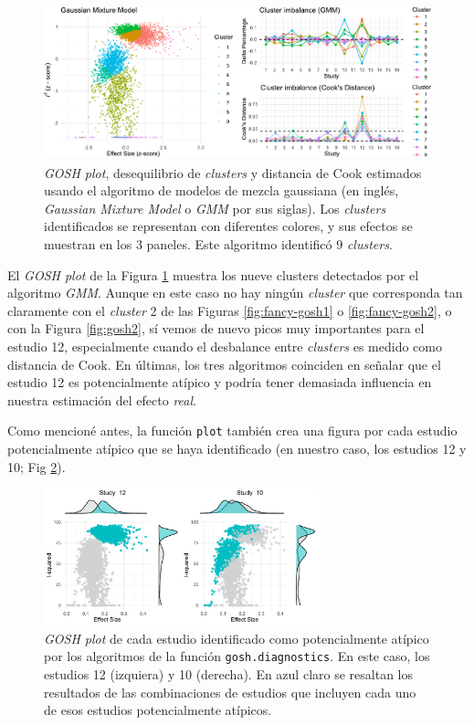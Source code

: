 \documentclass[
  bookmarksnumbered]{article}
\begin{document}
\begin{figure}

{\centering \includegraphics[height=170px]{images/fancy_gosh_P3} 

}

\caption{\textit{GOSH plot}, desequilibrio de \textit{clusters} y distancia de Cook estimados usando el algoritmo de modelos de mezcla gaussiana (en inglés, \textit{Gaussian Mixture Model} o \textit{GMM} por sus siglas). Los \textit{clusters} identificados se representan con diferentes colores, y sus efectos se muestran en los 3 paneles. Este algoritmo identificó 9 \textit{clusters}.}\label{fig:fancy-gosh3}
\end{figure}

El \emph{GOSH plot} de la Figura \ref{fig:fancy-gosh3} muestra los nueve clusters detectados por el algoritmo \emph{GMM}. Aunque en este caso no hay ningún \emph{cluster} que corresponda tan claramente con el \emph{cluster} 2 de las Figuras \ref{fig:fancy-gosh1} o \ref{fig:fancy-gosh2}, o con la Figura \ref{fig:gosh2}, sí vemos de nuevo picos muy importantes para el estudio 12, especialmente cuando el desbalance entre \emph{clusters} es medido como distancia de Cook. En últimas, los tres algoritmos coinciden en señalar que el estudio 12 es potencialmente atípico y podría tener demasiada influencia en nuestra estimación del efecto \emph{real}.

Como mencioné antes, la función \texttt{plot} también crea una figura por cada estudio potencialmente atípico que se haya identificado (en nuestro caso, los estudios 12 y 10; Fig \ref{fig:fancy-gosh4}).

\begin{figure}

{\centering \includegraphics[height=150px]{images/fancy_gosh_P4} 

}

\caption{\textit{GOSH plot} de cada estudio identificado como potencialmente atípico por los algoritmos de la función \texttt{gosh.diagnostics}. En este caso, los estudios 12 (izquiera) y 10 (derecha). En azul claro se resaltan los resultados de las combinaciones de estudios que incluyen cada uno de esos estudios potencialmente atípicos.}\label{fig:fancy-gosh4}
\end{figure}
\end{document}
